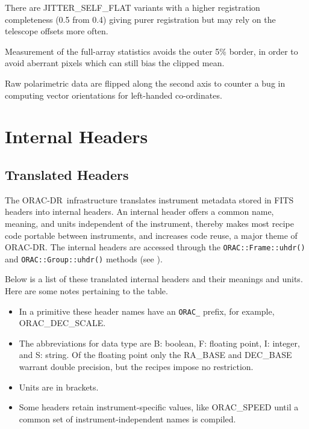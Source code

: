 \documentclass[twoside,11pt,nolof]{starlink}
\providecommand{\ORACDR}{{\footnotesize ORAC-DR}}
\providecommand{\POLPACK}{{\footnotesize POLPACK}}
\begin{document}
There are JITTER\_SELF\_FLAT variants with a higher registration
completeness (0.5 from 0.4) giving purer registration but may rely on
the telescope offsets more often.

Measurement of the full-array statistics avoids the outer 5\% border,
in order to avoid aberrant pixels which can still bias the clipped
mean.

Raw polarimetric data are flipped along the second axis to counter a
bug in \xref{\POLPACK}{sun223}{} computing vector orientations for
left-handed co-ordinates.

\newpage
\section{Internal Headers\label{internal_headers}}

\subsection{Translated Headers\label{translated_headers}}

The \ORACDR\ infrastructure translates instrument metadata stored in
FITS headers into internal headers.  An internal header offers a
common name, meaning, and units independent of the instrument, thereby
makes most recipe code portable between instruments, and increases
code reuse, a major theme of \ORACDR.  The internal headers are
accessed through the \texttt{ORAC::Frame::uhdr()} and \texttt{ORAC::Group::uhdr()} methods (see ).

Below is a list of these translated internal headers and their
meanings and units.  Here are some notes pertaining to the table.

\begin{itemize}
\item In a primitive these header names have an \texttt{ORAC\_} prefix,
for example, ORAC\_DEC\_SCALE.
\item The abbreviations for data type are B: boolean,
F: floating point, I: integer, and S: string.  Of the floating point
only the RA\_BASE and DEC\_BASE warrant double precision, but the
recipes impose no restriction.
\item Units are in brackets.
\item Some headers retain instrument-specific values, like ORAC\_SPEED
until a common set of instrument-independent names is compiled.
\end{itemize}
\end{document}

